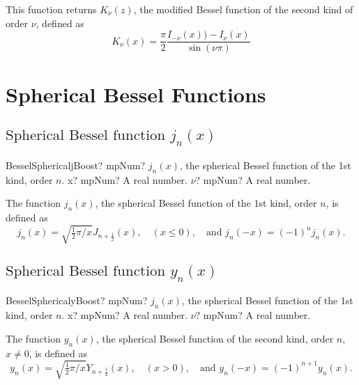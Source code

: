 \vspace{0.3cm}
This function returns $K_{\nu}(z)$, the modified Bessel function of the second kind of order $\nu$, defined as
\begin{equation}
	K_{\nu}(x)  = \frac{\pi}{2} \frac{I_{-\nu}(x)) - I_{\nu}(x)}{ \sin(\nu \pi)}
\end{equation}





\section{Spherical Bessel Functions}

\subsection{\texorpdfstring{$\text{Spherical Bessel function }j_n(x)$}{jjnx}}

\begin{mpFunctionsExtract}
	\mpFunctionTwo
	{BesselSphericaljBoost? mpNum? $j_n(x)$, the spherical Bessel function of the 1st kind, order $n$.}
	{x? mpNum? A real number.}
	{$\nu$? mpNum? A real number.}
\end{mpFunctionsExtract}

\vspace{0.3cm}
The function $j_n(x)$, the spherical Bessel function of the 1st kind, order $n$, is defined as
\begin{equation}
	j_n(x) = \sqrt{\tfrac{1}{2}\pi/x} J_{n+\tfrac{1}{2}}(x), \quad (x\leq 0), \quad \text{and } j_n(-x)=(-1)^n j_n(x).
\end{equation}




\subsection{\texorpdfstring{$\text{Spherical Bessel function }y_n(x)$}{yynx}}

\begin{mpFunctionsExtract}
	\mpFunctionTwo
	{BesselSphericalyBoost? mpNum? $j_n(x)$, the spherical Bessel function of the 1st kind, order $n$.}
	{x? mpNum? A real number.}
	{$\nu$? mpNum? A real number.}
\end{mpFunctionsExtract}

\vspace{0.3cm}
The function $y_n(x)$, the spherical Bessel function of the second kind, order $n$, $x \neq 0$, is defined as
\begin{equation}
	y_n(x) = \sqrt{\tfrac{1}{2}\pi/x} Y_{n+\tfrac{1}{2}}(x), \quad (x > 0), \quad \text{and } y_n(-x)=(-1)^{n+1} y_n(x).
\end{equation}



